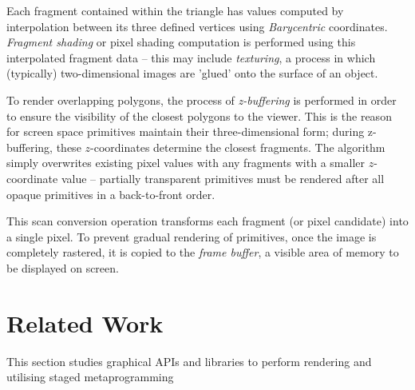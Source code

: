 \documentclass[12pt,twoside]{report}
\begin{document}
Each fragment contained within the triangle has values computed by interpolation between its three defined vertices using \textit{Barycentric} coordinates. \textit{Fragment shading} or pixel shading computation is performed using this interpolated fragment data -- this may include \textit{texturing}, a process in which (typically) two-dimensional images are 'glued' onto the surface of an object.

To render overlapping polygons, the process of \textit{z-buffering} is performed in order to ensure the visibility of the closest polygons to the viewer. This is the reason for screen space primitives maintain their three-dimensional form; during z-buffering, these \(z\)-coordinates determine the closest fragments. The algorithm simply overwrites existing pixel values with any fragments with a smaller \(z\)-coordinate value -- partially transparent primitives must be rendered after all opaque primitives in a back-to-front order.

This scan conversion operation transforms each fragment (or pixel candidate) into a single pixel. To prevent gradual rendering of primitives, once the image is completely rastered, it is copied to the \textit{frame buffer}, a visible area of memory to be displayed on screen.






\chapter{Related Work}

This section studies graphical APIs and libraries to perform rendering and utilising staged metaprogramming  

\end{document}
